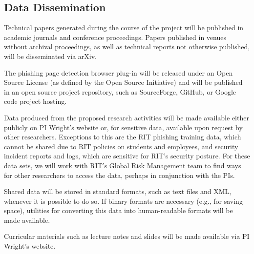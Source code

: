 \documentclass[11pt]{article}
\begin{document}
\subsection*{Data Dissemination}
Technical papers generated during the course of the project will be
published in academic journals and conference proceedings. Papers
published in venues without archival proceedings, as well as technical
reports not otherwise published, will be disseminated via arXiv.

The phishing page detection browser plug-in will be released under an
Open Source License (as defined by the Open Source Initiative) and will
be published in an open source project repository, such as SourceForge,
GitHub, or Google code project hosting.

Data produced from the proposed research activities will be made
available either publicly on PI Wright's website or, for sensitive data,
available upon request by other researchers. Exceptions to this are the
RIT phishing training data, which cannot be shared due to RIT policies
on students and employees, and security incident reports and logs, which
are sensitive for RIT's security posture. For these data sets, we will
work with RIT's Global Risk Management team to find ways for other
researchers to access the data, perhaps in conjunction with the PIs.

Shared data will be stored in standard formats, such as text files and
XML, whenever it is possible to do so. If binary formats are necessary
(e.g., for saving space), utilities for converting this data into
human-readable formats will be made available.

Curricular materials such as lecture notes and slides will be made
available via PI Wright's website.
\end{document}
